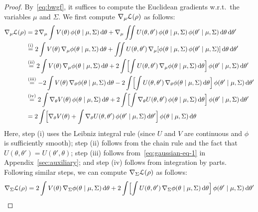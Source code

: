 \documentclass{custom}
\begin{document}
\begin{proof}
By~\eqref{eq:bwgf}, it suffices to compute the Euclidean gradients w.r.t.\ the variables $\mu$ and $\Sigma$. We first compute $\nabla_{\mu}\EuScript{L}(\rho)$
as follows:
\begin{align}
\nabla_{\mu}\EuScript{L}(\rho)
& =2\,\nabla_{\mu}\int V(\theta)\,\phi(\theta\mid \mu,\Sigma)\,\mathrm{d}\theta+\nabla_{\mu}\iint U(\theta,\theta')\,\phi(\theta\mid\mu,\Sigma)\,\phi(\theta'\mid\mu,\Sigma)\,\mathrm{d}\theta\,\mathrm{d}\theta'\nonumber \\
 & \overset{\text{(i)}}{=}2\int V(\theta)\,\nabla_{\mu}\phi(\theta\mid\mu,\Sigma)\,\mathrm{d}\theta+\iint U(\theta,\theta')\,\nabla_{\mu}[\phi(\theta \mid \mu,\Sigma)\,\phi(\theta' \mid \mu,\Sigma)]\,\mathrm{d}\theta\,\mathrm{d}\theta'\nonumber \\
 & \overset{\text{(ii)}}{=}2\int V(\theta)\,\nabla_{\mu}\phi(\theta \mid \mu,\Sigma)\,\mathrm{d}\theta+2\int\Bigl[\int U(\theta,\theta')\,\nabla_{\mu}\phi(\theta \mid \mu,\Sigma)\,\mathrm{d}\theta\Bigr]\,\phi(\theta' \mid \mu,\Sigma)\,\mathrm{d}\theta'\nonumber \\
 & \overset{\text{(iii)}}{=}-2\int V(\theta)\,\nabla_{\theta}\phi(\theta \mid \mu,\Sigma)\,\mathrm{d}\theta-2\int\Bigl[\int U(\theta,\theta')\,\nabla_{\theta}\phi(\theta \mid \mu,\Sigma)\,\mathrm{d}\theta\Bigr]\,\phi(\theta' \mid \mu,\Sigma)\,\mathrm{d}\theta'\nonumber \\
 & \overset{\text{(iv)}}{=}2\int\nabla_{\theta}V(\theta)\,\phi(\theta \mid \mu,\Sigma)\,\mathrm{d}\theta+2\int\Bigl[\int\nabla_{\theta}U(\theta,\theta')\,\phi(\theta \mid \mu,\Sigma)\,\mathrm{d}\theta\Bigr]\,\phi(\theta' \mid \mu,\Sigma)\,\mathrm{d}\theta'\nonumber \\
 &= 2\int\Bigl[\nabla_{\theta}V(\theta)+\int\nabla_{\theta}U(\theta,\theta')\,\phi(\theta' \mid \mu,\Sigma)\,\mathrm{d}\theta'\Bigr]\,\phi(\theta \mid \mu,\Sigma)\,\mathrm{d}\theta\label{eq:regression-grad-mu}
\end{align}
Here, step (i) uses the Leibniz integral rule (since $U$ and $V$
are continuous and $\phi$ is sufficiently smooth); step (ii) follows
from the chain rule and the fact that $U(\theta,\theta')=U(\theta',\theta)$;
step (iii) follows from~\eqref{eq:gaussian-eq-1} in Appendix~\ref{sec:auxiliary};
and step (iv) follows from integration by parts. Following similar
steps, we can compute $\nabla_{\Sigma}\EuScript{L}(\rho)$ as follows: 
\begin{align*}
\nabla_{\Sigma}\loss(\rho) & =2\int V(\theta)\,\nabla_{\Sigma}\phi(\theta \mid \mu,\Sigma)\,\mathrm{d}\theta+2\int\Bigl[\int U(\theta,\theta')\,\nabla_{\Sigma}\phi(\theta \mid \mu,\Sigma)\,\mathrm{d}\theta\Bigr]\,\phi(\theta' \mid \mu,\Sigma)\,\mathrm{d}\theta'\\

\end{align*}
\end{proof}
\end{document}
